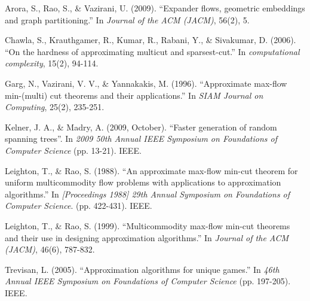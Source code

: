 \documentclass{article}
\begin{document}


















\begin{thebibliography}{99}
Arora, S., Rao, S., \& Vazirani, U. (2009). ``Expander flows, geometric embeddings and graph partitioning.'' In \emph{Journal of the ACM (JACM)}, 56(2), 5.

Chawla, S., Krauthgamer, R., Kumar, R., Rabani, Y., \& Sivakumar, D. (2006). ``On the hardness of approximating multicut and sparsest-cut.'' In \emph{computational complexity}, 15(2), 94-114.

Garg, N., Vazirani, V. V., \& Yannakakis, M. (1996). ``Approximate max-flow min-(multi) cut theorems and their applications.'' In \emph{SIAM Journal on Computing}, 25(2), 235-251.

Kelner, J. A., \& Madry, A. (2009, October). ``Faster generation of random spanning trees''. In \emph{2009 50th Annual IEEE Symposium on Foundations of Computer Science} (pp. 13-21). IEEE.

Leighton, T., \& Rao, S. (1988). ``An approximate max-flow min-cut theorem for uniform multicommodity flow problems with applications to approximation algorithms.'' In \emph{[Proceedings 1988] 29th Annual Symposium on Foundations of Computer Science}. (pp. 422-431). IEEE.

Leighton, T., \& Rao, S. (1999). ``Multicommodity max-flow min-cut theorems and their use in designing approximation algorithms.'' In \emph{Journal of the ACM (JACM)}, 46(6), 787-832.

Trevisan, L. (2005). ``Approximation algorithms for unique games.'' In \emph{46th Annual IEEE Symposium on Foundations of Computer Science} (pp. 197-205). IEEE.
\end{thebibliography}
\end{document}
